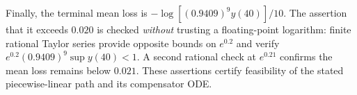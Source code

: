 \documentclass[11pt]{article}
\numberwithin{equation}{section}
\theoremstyle{definition}
\theoremstyle{remark}
\begin{document}
Finally, the terminal mean loss is $-\log[(0.9409)^9 y(40)]/10$. The assertion that it exceeds $0.020$ is checked \emph{without} trusting a floating-point logarithm: finite rational Taylor series provide opposite bounds on $e^{0.2}$ and verify $e^{0.2}(0.9409)^9\sup y(40)<1$. A second rational check at $e^{0.21}$ confirms the mean loss remains below $0.021$. These assertions certify feasibility of the stated piecewise-linear path and its compensator ODE.



\end{document}
